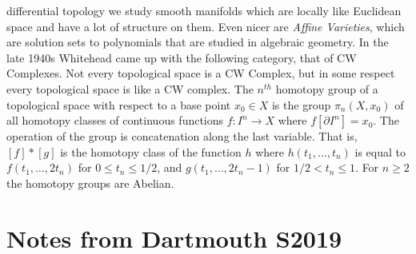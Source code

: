         differential topology we study smooth manifolds which are locally like
        Euclidean space and have a lot of structure on them. Even nicer are
        \textit{Affine Varieties}, which are solution sets to polynomials that are
        studied in algebraic geometry. In the late 1940s Whitehead came up with the
        following category, that of CW Complexes. Not every topological space is a
        CW Complex, but in some respect every topological space is like a CW
        complex. The $n^{th}$ homotopy group of a topological space with respect
        to a base point $x_{0}\in{X}$ is the group $\pi_{n}(X,x_{0})$ of all
        homotopy classes of continuous functions $f:I^{n}\rightarrow{X}$
        where $f[\partial{I}^{n}]=x_{0}$. The operation of the group is
        concatenation along the last variable. That is, $[f]*[g]$ is the homotopy
        class of the function $h$ where $h(t_{1},\dots,t_{n})$ is equal to
        $f(t_{1},\dots,2t_{n})$ for $0\leq{t}_{n}\leq{1}/2$, and
        $g(t_{1},\dots,2t_{n}-1)$ for $1/2<t_{n}\leq{1}$. For $n\geq{2}$ the
        homotopy groups are Abelian.

\section{Notes from Dartmouth S2019}
